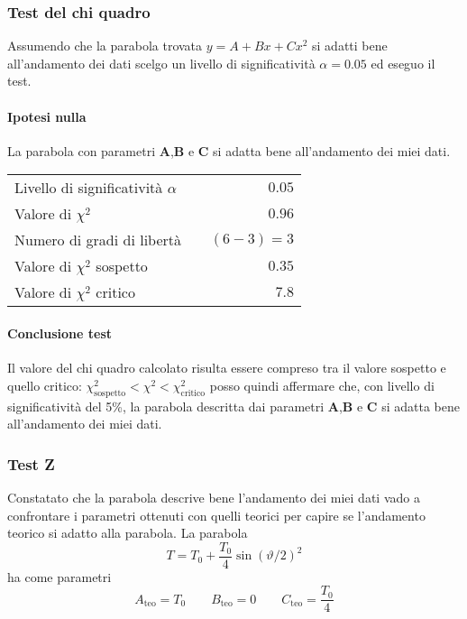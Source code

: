 \documentclass{article}
\begin{document}
	
	\subsubsection{Test del chi quadro}
	Assumendo che la parabola trovata $y=A+Bx+Cx^2$ si adatti bene all'andamento dei dati scelgo un livello di significatività $\alpha = 0.05$ ed eseguo il test.
	
	\paragraph{Ipotesi nulla} La parabola con parametri \textbf{A},\textbf{B} e \textbf{C} si adatta bene all'andamento dei miei dati.
	
	\vspace{0.7cm}
	\begin{table}[H]
		\centering
		\begin{tabular}{lr} 
			Livello di significatività $\alpha$		&$\quad 0.05$  \\
			Valore di $\chi ^2$             		& $\quad 0.96$       \\
			Numero di gradi di libertà      		& $\quad (6-3) = 3$         \\   
			Valore di $\chi ^2$ sospetto			& $\quad 0.35$ \\
			Valore di $\chi ^2$ critico     		& $\quad 7.8$
		\end{tabular}
	\end{table}
	\vspace{0.7cm}
	
	\paragraph{Conclusione test}
	Il valore del chi quadro calcolato risulta essere compreso tra il valore sospetto e quello critico: $\chi^2_\text{sospetto} < \chi ^2 < \chi^2_\text{critico}$ posso quindi affermare che, con livello di significatività del 5\%, la parabola descritta dai parametri \textbf{A},\textbf{B} e \textbf{C} si adatta bene all'andamento dei miei dati.
	
	
	\subsubsection{Test Z}
	Constatato che la parabola descrive bene l'andamento dei miei dati vado a confrontare i parametri ottenuti con quelli teorici per capire se l'andamento teorico si adatto alla parabola. La parabola  
	\[
	T = T_0 + \frac{T_0}{4}\sin{(\vartheta/2)}^2
	\]
	ha come parametri 
	\[
	A_\text{teo} = T_0 \qquad B_\text{teo} = 0 \qquad C_\text{teo} =  \frac{T_0}{4} 
	\]
	
\end{document}
